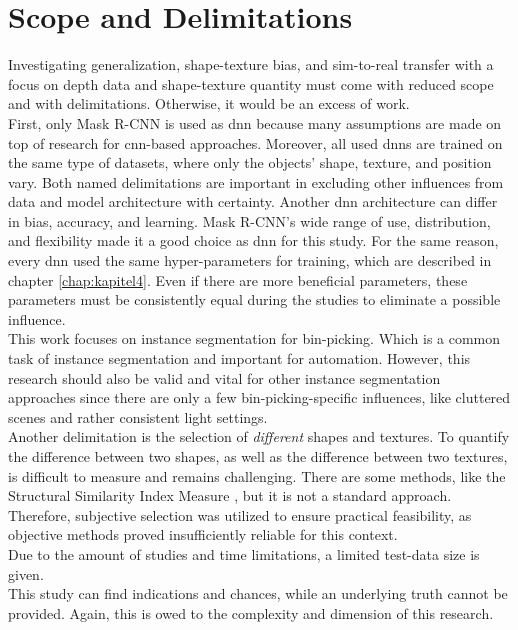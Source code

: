 	
	
	\section{Scope and Delimitations}
	\label{sec:scope-and-delimitations}
		Investigating generalization, shape-texture bias, and sim-to-real transfer with a focus on depth data and shape-texture quantity must come with reduced scope and with delimitations. Otherwise, it would be an excess of work. \\
		First, only Mask R-CNN \cite{Kaiming2017} is used as \ac{dnn} because many assumptions are made on top of research for \ac{cnn}-based approaches.
		Moreover, all used \ac{dnn}s are trained on the same type of datasets, where only the objects' shape, texture, and position vary.
		Both named delimitations are important in excluding other influences from data and model architecture with certainty. Another \ac{dnn} architecture can differ in bias, accuracy, and learning. Mask R-CNN's wide range of use, distribution, and flexibility made it a good choice as \ac{dnn} for this study.
		For the same reason, every \ac{dnn} used the same hyper-parameters for training, which are described in chapter \ref{chap:kapitel4}. Even if there are more beneficial parameters, these parameters must be consistently equal during the studies to eliminate a possible influence.\\
		This work focuses on instance segmentation for bin-picking. Which is a common task of instance segmentation and important for automation\cite{Raj2023}\cite{Danielczuk2019}\cite{Xie2021}. However, this research should also be valid and vital for other instance segmentation approaches since there are only a few bin-picking-specific influences, like cluttered scenes and rather consistent light settings.\\
		Another delimitation is the selection of \textit{different} shapes and textures. To quantify the difference between two shapes, as well as the difference between two textures, is difficult to measure and remains challenging. There are some methods, like the Structural Similarity Index Measure \cite{Wang2004}, but it is not a standard approach. Therefore, subjective selection was utilized to ensure practical feasibility, as objective methods proved insufficiently reliable for this context.
		\\
		Due to the amount of studies and time limitations, a limited test-data size is given.\\
		This study can find indications and chances, while an underlying truth cannot be provided. Again, this is owed to the complexity and dimension of this research.\\
